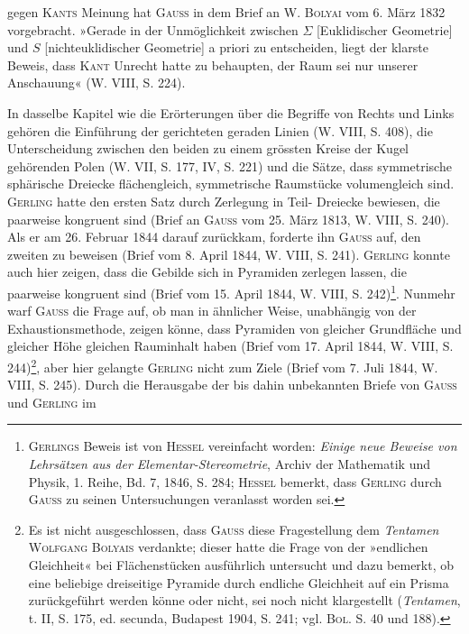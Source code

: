 gegen \textsc{Kants} Meinung hat \textsc{Gauss} in dem Brief an W. \textsc{Bolyai} vom 6. März
1832 vorgebracht. »Gerade in der Unmöglichkeit zwischen \(\Sigma\) [Euklidischer
Geometrie] und \(S\) [nichteuklidischer Geometrie] a priori zu entscheiden, liegt
der klarste Beweis, dass \textsc{Kant} Unrecht hatte zu behaupten, der Raum sei nur
 unserer Anschauung« (W. VIII, S. 224).
\par
In dasselbe Kapitel wie die Erörterungen über die Begriffe von Rechts
und Links gehören die Einführung der gerichteten geraden Linien (W. VIII,
S. 408), die Unterscheidung zwischen den beiden zu einem grössten Kreise
der Kugel gehörenden Polen (W. VII, S. 177, IV, S. 221) und die Sätze, dass
symmetrische sphärische Dreiecke flächengleich, symmetrische Raumstücke
volumengleich sind. \textsc{Gerling} hatte den ersten Satz durch Zerlegung in Teil-
Dreiecke bewiesen, die paarweise kongruent sind (Brief an \textsc{Gauss} vom 25. März
1813, W. VIII, S. 240). Als er am 26. Februar 1844 darauf zurückkam,
forderte ihn \textsc{Gauss} auf, den zweiten zu beweisen (Brief vom 8. April 1844,
W. VIII, S. 241). \textsc{Gerling} konnte auch hier zeigen, dass die Gebilde sich
in Pyramiden zerlegen lassen, die paarweise kongruent sind (Brief vom 15. April
1844, W. VIII, S. 242)\footnote{\textsc{Gerlings} Beweis ist von \textsc{Hessel} vereinfacht worden: \textit{Einige neue Beweise von Lehrsätzen aus der Elementar-Stereometrie}, Archiv der Mathematik und Physik, 1. Reihe, Bd. 7, 1846, S. 284; \textsc{Hessel} bemerkt, dass \textsc{Gerling} durch \textsc{Gauss} zu seinen Untersuchungen veranlasst worden sei.}. Nunmehr warf \textsc{Gauss} die Frage auf, ob man in
ähnlicher Weise, unabhängig von der Exhaustionsmethode, zeigen könne, dass
Pyramiden von gleicher Grundfläche und gleicher Höhe gleichen Rauminhalt
haben (Brief vom 17. April 1844, W. VIII, S. 244)\footnote{Es ist nicht ausgeschlossen, dass \textsc{Gauss} diese Fragestellung dem \textit{Tentamen} \textsc{Wolfgang Bolyais} verdankte; dieser hatte die Frage von der »endlichen Gleichheit« bei Flächenstücken ausführlich untersucht und dazu bemerkt, ob eine beliebige dreiseitige Pyramide durch endliche Gleichheit auf ein Prisma zurückgeführt werden könne oder nicht, sei noch nicht klargestellt (\textit{Tentamen}, t. II, S. 175, ed. secunda, Budapest 1904, S. 241; vgl. \textsc{Bol.} S. 40 und 188).}, aber hier gelangte \textsc{Gerling}
nicht zum Ziele (Brief vom 7. Juli 1844, W. VIII, S. 245). Durch die
Herausgabe der bis dahin unbekannten Briefe von \textsc{Gauss} und \textsc{Gerling} im
